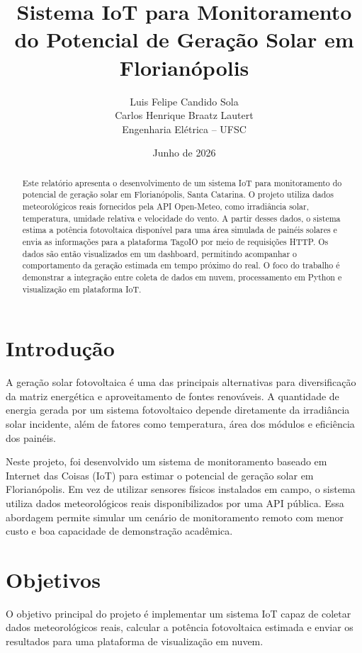 \documentclass[12pt,a4paper]{article}
\title{\textbf{Sistema IoT para Monitoramento do Potencial de Geração Solar em Florianópolis}}
\author{
Luis Felipe Candido Sola \\
Carlos Henrique Braatz Lautert \\
\small Engenharia Elétrica -- UFSC
}
\date{Junho de 2026}
\begin{document}
\maketitle

\begin{abstract}
Este relatório apresenta o desenvolvimento de um sistema IoT para monitoramento do potencial de geração solar em Florianópolis, Santa Catarina. O projeto utiliza dados meteorológicos reais fornecidos pela API Open-Meteo, como irradiância solar, temperatura, umidade relativa e velocidade do vento. A partir desses dados, o sistema estima a potência fotovoltaica disponível para uma área simulada de painéis solares e envia as informações para a plataforma TagoIO por meio de requisições HTTP. Os dados são então visualizados em um dashboard, permitindo acompanhar o comportamento da geração estimada em tempo próximo do real. O foco do trabalho é demonstrar a integração entre coleta de dados em nuvem, processamento em Python e visualização em plataforma IoT.
\end{abstract}

\section{Introdução}

A geração solar fotovoltaica é uma das principais alternativas para diversificação da matriz energética e aproveitamento de fontes renováveis. A quantidade de energia gerada por um sistema fotovoltaico depende diretamente da irradiância solar incidente, além de fatores como temperatura, área dos módulos e eficiência dos painéis.

Neste projeto, foi desenvolvido um sistema de monitoramento baseado em Internet das Coisas (IoT) para estimar o potencial de geração solar em Florianópolis. Em vez de utilizar sensores físicos instalados em campo, o sistema utiliza dados meteorológicos reais disponibilizados por uma API pública. Essa abordagem permite simular um cenário de monitoramento remoto com menor custo e boa capacidade de demonstração acadêmica.

\section{Objetivos}

O objetivo principal do projeto é implementar um sistema IoT capaz de coletar dados meteorológicos reais, calcular a potência fotovoltaica estimada e enviar os resultados para uma plataforma de visualização em nuvem.
\end{document}

